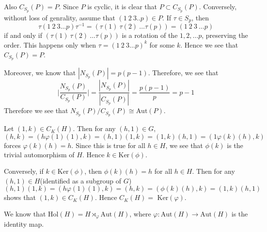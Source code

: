 \documentclass[12pt]{exam}
\theoremstyle{plain} %
\theoremstyle{definition} %
\theoremstyle{remark} %
\begin{document}
\begin{questions}
\begin{solution}
    Also $C_{S_p}(P) = P$. Since $P$ is cyclic, it is clear that $P
    \subset C_{S_p}( P)$. Conversely, without loss of genrality,
    assume that $(1\ 2 \ 3 .. p) \in P$. If $\tau \in S_p$, then \[
      \tau (1\ 2 \ 3 \ldots p) \tau^{-1} = (\tau(1)\ \tau(2)\ \ldots
      \tau(p)) = (1\ 2\ 3\  \ldots p)
    \]
    if and only if $(\tau(1)\ \tau(2)\ \ldots \tau(p))$ is a rotation
    of the $1, 2, \ldots p$, preserving the order. This happens only
    when $\tau = (1\ 2 \ 3 \ldots p)^k$ for some $k$. Hence we see
    that $C_{S_p}(P) = P$.

    Moreover, we know that $|N_{S_p}(P)| = p(p-1)$. Therefore, we see that \[
      \Bigg | \frac{N_{S_p}(P)}{C_{S_p}(P)} \Bigg| =
      \frac{|N_{S_p}(P)|}{|C_{S_p}(P)|} = \frac{p(p-1)}{p} = p-1
    \]
    Therefore we see that  $N_{S_p}(P)/C_{S_p}(P) \cong \textrm{Aut}(P)$.
  \end{solution}

  \question
  \begin{solution}
    Let $(1, k) \in C_K(H)$. Then for any $(h, 1) \in G$, $$(h, k) =
    (h\varphi(1)(1), k) = (h, 1)(1,k)  = (1, k)(h, 1) =  (1\varphi(k)(h), k)$$
    forces $\varphi(k)(h) = h$. Since this is true for all $h \in H$,
    we see that $\phi(k)$ is the trivial automorphism of $H$. Hence
    $k \in \textrm{Ker}(\phi)$.

    Conversely, if $k \in \textrm{Ker}(\phi)$, then $\phi(k)(h) = h$
    for all $h \in H$. Then for any $(h, 1) \in H$(identified as a
    subgroup of $G$) \[
      (h, 1)(1, k) = (h \varphi(1)(1), k) = (h, k) = (\phi(k)(h), k)
      = (1, k)(h, 1)
    \]
    shows that $(1, k) \in C_K(H)$. Hence $C_K(H) = \textrm{ Ker}(\varphi)$.
  \end{solution}

  \question
  \begin{solution}
    We know that $\textrm{Hol}(H) = H \rtimes_\varphi \textrm{Aut}(H)$,
    where $\varphi: \textrm{Aut}(H) \to \textrm{Aut}(H)$ is the identity map.
\end{solution}
\end{questions}
\end{document}
